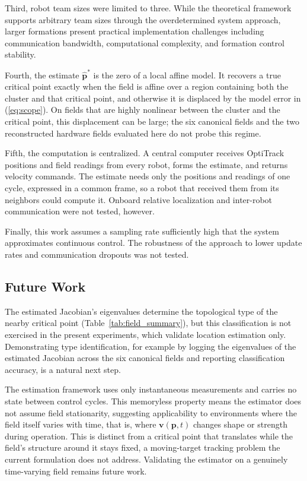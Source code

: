 \documentclass[lettersize,journal]{IEEEtran}
\begin{document}
Third, robot team sizes were limited to three. While the theoretical framework supports arbitrary team sizes through the overdetermined system approach, larger formations present practical implementation challenges including communication bandwidth, computational complexity, and formation control stability.

Fourth, the estimate $\hat{\mathbf{p}}^*$ is the zero of a local affine model. It recovers a true critical point exactly when the field is affine over a region containing both the cluster and that critical point, and otherwise it is displaced by the model error in (\ref{eq:scope}). On fields that are highly nonlinear between the cluster and the critical point, this displacement can be large; the six canonical fields and the two reconstructed hardware fields evaluated here do not probe this regime.

Fifth, the computation is centralized. A central computer receives OptiTrack positions and field readings from every robot, forms the estimate, and returns velocity commands. The estimate needs only the positions and readings of one cycle, expressed in a common frame, so a robot that received them from its neighbors could compute it. Onboard relative localization and inter-robot communication were not tested, however.

Finally, this work assumes a sampling rate sufficiently high that the system approximates continuous control. The robustness of the approach to lower update rates and communication dropouts was not tested.

\subsection{Future Work}

The estimated Jacobian's eigenvalues determine the topological type of the nearby critical point (Table~\ref{tab:field_summary}), but this classification is not exercised in the present experiments, which validate location estimation only. Demonstrating type identification, for example by logging the eigenvalues of the estimated Jacobian across the six canonical fields and reporting classification accuracy, is a natural next step.

The estimation framework uses only instantaneous measurements and carries no state between control cycles. This memoryless property means the estimator does not assume field stationarity, suggesting applicability to environments where the field itself varies with time, that is, where $\mathbf{v}(\mathbf{p}, t)$ changes shape or strength during operation. This is distinct from a critical point that translates while the field's structure around it stays fixed, a moving-target tracking problem the current formulation does not address. Validating the estimator on a genuinely time-varying field remains future work.
\end{document}
